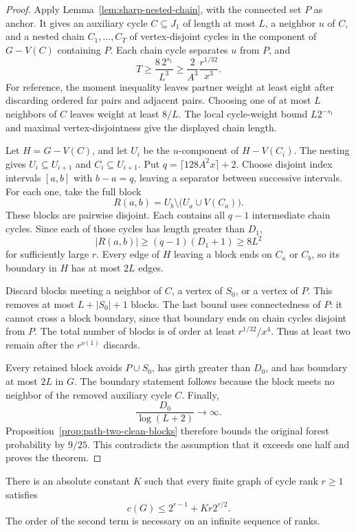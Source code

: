 \begin{proof}
Apply Lemma~\ref{lem:sharp-nested-chain}, with the connected set $P$ as anchor.
It gives an auxiliary cycle $C\subseteq J_1$ of length at most $L$, a neighbor $u$ of $C$, and a nested chain
$C_1,\ldots,C_T$ of vertex-disjoint cycles in the component of $G-V(C)$ containing $P$.
Each chain cycle separates $u$ from $P$, and
\[
 T\ge\frac{8\,2^{s_1}}{L^3}
 \ge\frac{2}{A^3}\frac{r^{1/32}}{x^3}.
\]
For reference, the moment inequality leaves partner weight at least eight after discarding ordered far pairs and adjacent pairs.
Choosing one of at most $L$ neighbors of $C$ leaves weight at least $8/L$.
The local cycle-weight bound $L2^{-s_1}$ and maximal vertex-disjointness give the displayed chain length.

Let $H=G-V(C)$, and let $U_i$ be the $u$-component of $H-V(C_i)$.
The nesting gives $U_i\subseteq U_{i+1}$ and $C_i\subseteq U_{i+1}$.
Put $q=\lceil128A^2x\rceil+2$.
Choose disjoint index intervals $[a,b]$ with $b-a=q$, leaving a separator between successive intervals.
For each one, take the full block
\[
 R(a,b)=U_b\setminus\bigl(U_a\cup V(C_a)\bigr).
\]
These blocks are pairwise disjoint.
Each contains all $q-1$ intermediate chain cycles.
Since each of those cycles has length greater than $D_1$,
\[
 |R(a,b)|\ge(q-1)(D_1+1)\ge8L^2
\]
for sufficiently large $r$.
Every edge of $H$ leaving a block ends on $C_a$ or $C_b$, so its boundary in $H$ has at most $2L$ edges.

Discard blocks meeting a neighbor of $C$, a vertex of $S_0$, or a vertex of $P$.
This removes at most $L+|S_0|+1$ blocks.
The last bound uses connectedness of $P$: it cannot cross a block boundary, since that boundary ends on chain cycles disjoint from $P$.
The total number of blocks is of order at least $r^{1/32}/x^4$.
Thus at least two remain after the $r^{o(1)}$ discards.

Every retained block avoids $P\cup S_0$, has girth greater than $D_0$, and has boundary at most $2L$ in $G$.
The boundary statement follows because the block meets no neighbor of the removed auxiliary cycle $C$.
Finally,
\[
 \frac{D_0}{\log(L+2)}\longrightarrow\infty.
\]
Proposition~\ref{prop:path-two-clean-blocks} therefore bounds the original forest probability by $9/25$.
This contradicts the assumption that it exceeds one half and proves the theorem.
\end{proof}

\begin{theorem}
\label{thm:bootstrap-unrestricted-sharp-error}
There is an absolute constant $K$ such that every finite graph of cycle rank $r\ge1$ satisfies
\[
 c(G)\le2^{r-1}+Kr2^{r/2}.
\]
The order of the second term is necessary on an infinite sequence of ranks.
\end{theorem}

